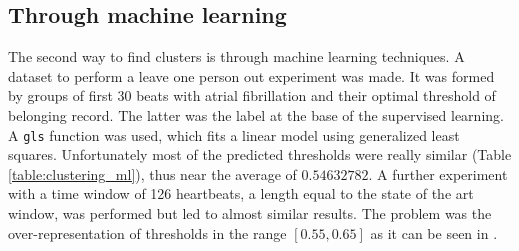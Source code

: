 \subsection{Through machine learning}
The second way to find clusters is through machine learning techniques. A dataset to perform a leave one person out experiment was made. It was formed by groups of first $30$ beats with atrial fibrillation and their optimal threshold of belonging record. The latter was the label at the base of the supervised learning. A \verb|gls| function was used, which fits a linear model using generalized least squares. Unfortunately most of the predicted thresholds were really similar (Table \ref{table:clustering_ml}), thus near the average of $0.54632782$. A further experiment with a time window of 126 heartbeats, a length equal to the state of the art window, was performed but led to almost similar results. The problem was the over-representation of thresholds in the range $[0.55, 0.65]$ as it can be seen in .
